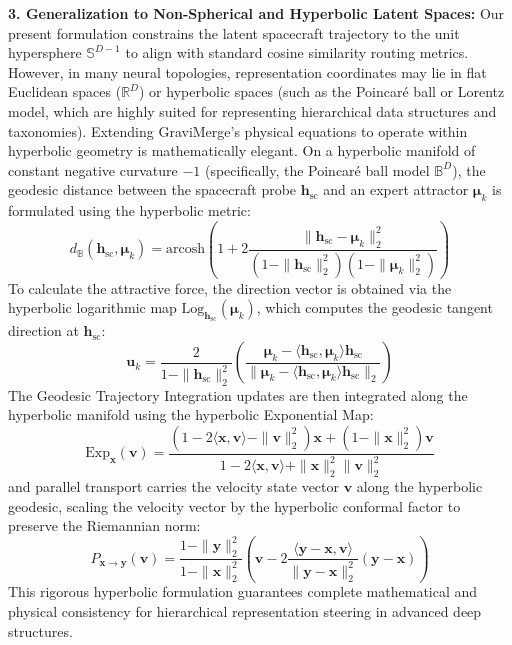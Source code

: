 \textbf{3. Generalization to Non-Spherical and Hyperbolic Latent Spaces: } Our present formulation constrains the latent spacecraft trajectory to the unit hypersphere $\mathbb{S}^{D-1}$ to align with standard cosine similarity routing metrics. However, in many neural topologies, representation coordinates may lie in flat Euclidean spaces ($\mathbb{R}^D$) or hyperbolic spaces (such as the Poincaré ball or Lorentz model, which are highly suited for representing hierarchical data structures and taxonomies). Extending GraviMerge's physical equations to operate within hyperbolic geometry is mathematically elegant. On a hyperbolic manifold of constant negative curvature $-1$ (specifically, the Poincaré ball model $\mathbb{B}^D$), the geodesic distance between the spacecraft probe $\mathbf{h}_{\text{sc}}$ and an expert attractor $\boldsymbol{\mu}_k$ is formulated using the hyperbolic metric:
\begin{equation}
    d_{\mathbb{B}}(\mathbf{h}_{\text{sc}}, \boldsymbol{\mu}_k) = \text{arcosh}\left( 1 + 2 \frac{\|\mathbf{h}_{\text{sc}} - \boldsymbol{\mu}_k\|_2^2}{(1 - \|\mathbf{h}_{\text{sc}}\|_2^2)(1 - \|\boldsymbol{\mu}_k\|_2^2)} \right)
\end{equation}
To calculate the attractive force, the direction vector is obtained via the hyperbolic logarithmic map $\text{Log}_{\mathbf{h}_{\text{sc}}}(\boldsymbol{\mu}_k)$, which computes the geodesic tangent direction at $\mathbf{h}_{\text{sc}}$:
\begin{equation}
    \mathbf{u}_k = \frac{2}{1 - \|\mathbf{h}_{\text{sc}}\|_2^2} \left( \frac{\boldsymbol{\mu}_k - \langle\mathbf{h}_{\text{sc}}, \boldsymbol{\mu}_k\rangle\mathbf{h}_{\text{sc}}}{\|\boldsymbol{\mu}_k - \langle\mathbf{h}_{\text{sc}}, \boldsymbol{\mu}_k\rangle\mathbf{h}_{\text{sc}}\|_2} \right)
\end{equation}
The Geodesic Trajectory Integration updates are then integrated along the hyperbolic manifold using the hyperbolic Exponential Map:
\begin{equation}
    \text{Exp}_{\mathbf{x}}(\mathbf{v}) = \frac{(1 - 2\langle\mathbf{x}, \mathbf{v}\rangle - \|\mathbf{v}\|_2^2)\mathbf{x} + (1 - \|\mathbf{x}\|_2^2)\mathbf{v}}{1 - 2\langle\mathbf{x}, \mathbf{v}\rangle + \|\mathbf{x}\|_2^2 \|\mathbf{v}\|_2^2}
\end{equation}
and parallel transport carries the velocity state vector $\mathbf{v}$ along the hyperbolic geodesic, scaling the velocity vector by the hyperbolic conformal factor to preserve the Riemannian norm:
\begin{equation}
    P_{\mathbf{x} \to \mathbf{y}}(\mathbf{v}) = \frac{1 - \|\mathbf{y}\|_2^2}{1 - \|\mathbf{x}\|_2^2} \left( \mathbf{v} - 2 \frac{\langle\mathbf{y} - \mathbf{x}, \mathbf{v}\rangle}{\|\mathbf{y} - \mathbf{x}\|_2^2} (\mathbf{y} - \mathbf{x}) \right)
\end{equation}
This rigorous hyperbolic formulation guarantees complete mathematical and physical consistency for hierarchical representation steering in advanced deep structures.

